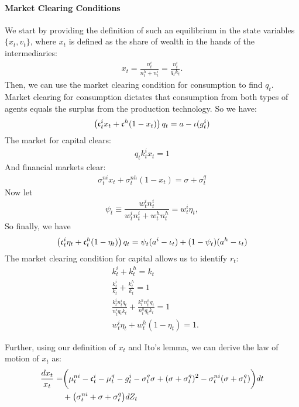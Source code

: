 \documentclass[12pt,english]{article}
\begin{document}
\paragraph{Market Clearing Conditions} We start by providing the definition of such an equilibrium in the state variables $\{x_t, v_t\}$, where $x_t$ is defined as the share of wealth in the hands of the intermediaries:
\begin{align*}
x_t  = \frac{n^i_t}{n^h_t+n^i_t} = \frac{n^i_t}{q_t k_t}.
\end{align*}
Then, we can use the market clearing condition for consumption to find $q_t$. Market clearing for consumption dictates that consumption from both types of agents equals the surplus from the production technology. So we have: 
\begin{align*}
\left(\frak{c}_t^ix_t + \frak{c}^h(1 - x_t)\right)q_t = a - \iota(g^i_t)
\end{align*}
The market for capital clears:
\begin{align}
	q_tk_t^ix_t = 1
\end{align}
And financial markets clear:
\begin{align}
	\sigma_t^{ni}x_t + \sigma_t^{nh}(1 - x_t) = \sigma + \sigma_t^q
\end{align}
Now let 
\begin{equation}
\psi_t \equiv \frac{w^i_t n^i_t}{w^i_t n^i_t + w^h_t n^h_t} = w^i_t \eta_t,
\end{equation} 
So finally, we have
\begin{equation}
\left(\frak{c}^i_t  \eta_t+  \frak{c}^h_t (1-\eta_t) \right) q_t= \psi_t (a^i - \iota_t) + (1-\psi_t) (a^h -  \iota_t)
\end{equation} 
The market clearing condition for capital allows us to identify $r_t$:
\begin{align*}
&k_t^i + k_t^h = k_t\\
&\frac{k_t^i}{k_t} + \frac{k_t^h}{k_t} = 1\\
&\frac{k_t^in_t^iq_t}{n_t^iq_tk_t} + \frac{k_t^hn_t^hq_t}{n_t^hq_tk_t} = 1\\
&w^i_t  \eta_t +  w^h_t (1-\eta_t) = 1.
\end{align*} 

Further, using our definition of $x_t$ and Ito's lemma, we can derive the law of motion of $x_t$ as: 
\begin{equation}\label{eq:lometa}
\begin{split}
\frac{dx_t}{x_t}=  &\bigg(\mu_t^{ni} - \frak{c}_t^i - \mu_t^q - g_t^i - \sigma_t^q\sigma  + (\sigma + \sigma_t^q)^2 - \sigma_t^{ni}(\sigma + \sigma_t^q) \bigg) dt \nonumber\\
& + \big(\sigma_t^{ni} + \sigma + \sigma_t^q\big)dZ_t
\end{split}
\end{equation}
\end{document}
